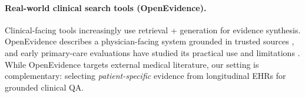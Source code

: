 \paragraph{Real-world clinical search tools (OpenEvidence).}
Clinical-facing tools increasingly use retrieval + generation for evidence synthesis. OpenEvidence describes a physician-facing system grounded in trusted sources \citep{openevidence_about}, and early primary-care evaluations have studied its practical use and limitations \citep{hurt2025openevidence}. While OpenEvidence targets external medical literature, our setting is complementary: selecting \emph{patient-specific} evidence from longitudinal EHRs for grounded clinical QA.